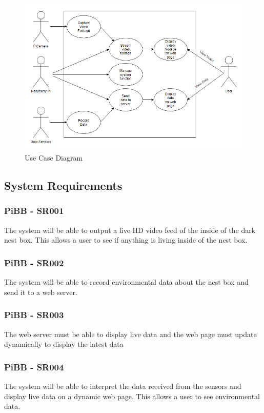 \documentclass[10pt,a4paper]{article}
\begin{document}
\begin{figure}[H]
\centering
  \includegraphics[width=\linewidth]{images/use_case_diagram.png}
  \caption{Use Case Diagram}
  \label{fig:usecasediagram}
\end{figure}

\subsection{System Requirements}
\subsubsection{PiBB - SR001}
The system will be able to output a live HD video feed of the inside of the dark nest box. This allows a user to see if anything is living inside of the nest box.
\subsubsection{PiBB - SR002}
The system will be able to record environmental data about the nest box and send it to a web server.
\subsubsection{PiBB - SR003}
The web server must be able to display live data and the web page must update dynamically to display the latest data
\subsubsection{PiBB - SR004}
The system will be able to interpret the data received from the sensors and display live data on a dynamic web page. This allows a user to see environmental data.
\end{document}
